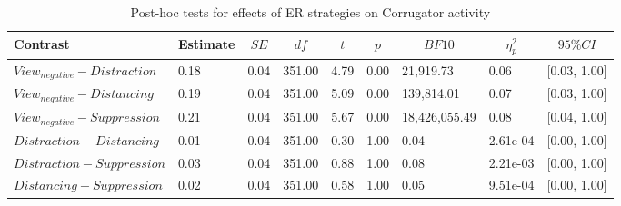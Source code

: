 \documentclass[
  man,floatsintext]{apa6}
\begin{document}
\begin{table}[H]

\begin{center}
\begin{threeparttable}

\caption{\label{tab:SupplEffectER}Post-hoc tests for effects of ER strategies on Corrugator activity}

\begin{tabular}{lllllllll}
\toprule
Contrast & \multicolumn{1}{c}{Estimate} & \multicolumn{1}{c}{$SE$} & \multicolumn{1}{c}{$df$} & \multicolumn{1}{c}{$t$} & \multicolumn{1}{c}{$p$} & \multicolumn{1}{c}{$BF10$} & \multicolumn{1}{c}{$\eta_{p}^{2}$} & \multicolumn{1}{c}{$95\% CI$}\\
\midrule
$View_{negative} - Distraction$ & 0.18 & 0.04 & 351.00 & 4.79 & 0.00 & 21,919.73 & 0.06 & {}[0.03, 1.00]\\
$View_{negative} - Distancing$ & 0.19 & 0.04 & 351.00 & 5.09 & 0.00 & 139,814.01 & 0.07 & {}[0.03, 1.00]\\
$View_{negative} - Suppression$ & 0.21 & 0.04 & 351.00 & 5.67 & 0.00 & 18,426,055.49 & 0.08 & {}[0.04, 1.00]\\
$Distraction - Distancing$ & 0.01 & 0.04 & 351.00 & 0.30 & 1.00 & 0.04 & 2.61e-04 & {}[0.00, 1.00]\\
$Distraction - Suppression$ & 0.03 & 0.04 & 351.00 & 0.88 & 1.00 & 0.08 & 2.21e-03 & {}[0.00, 1.00]\\
$Distancing - Suppression$ & 0.02 & 0.04 & 351.00 & 0.58 & 1.00 & 0.05 & 9.51e-04 & {}[0.00, 1.00]\\
\bottomrule
\end{tabular}

\end{threeparttable}
\end{center}

\end{table}
\end{document}
